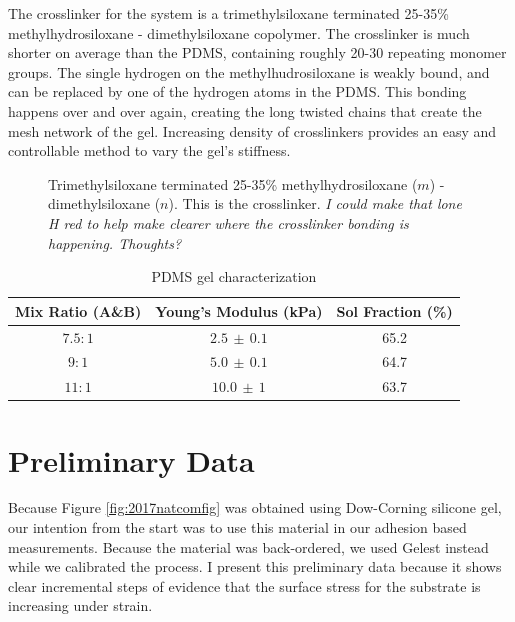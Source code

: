 The crosslinker for the system is a trimethylsiloxane terminated 25-35\% methylhydrosiloxane - dimethylsiloxane copolymer. The crosslinker is much shorter on average than the PDMS, containing roughly 20-30 repeating monomer groups. The single hydrogen on the methylhudrosiloxane is weakly bound, and can be replaced by one of the hydrogen atoms in the PDMS. This bonding happens over and over again, creating the long twisted chains that create the mesh network of the gel. Increasing density of crosslinkers provides an easy and controllable method to vary the gel's stiffness.

\begin{figure}
	\centering
	\label{fig:HMS-301}
	\caption[HMS-301]{Trimethylsiloxane terminated 25-35\% methylhydrosiloxane ($m$) - dimethylsiloxane ($n$). This is the crosslinker. \emph{I could make that lone H red to help make clearer where the crosslinker bonding is happening. Thoughts?}}
\end{figure}

\begin{table}[h!]
	\caption[PDMS ratios Characterization]{PDMS gel characterization}
	\begin{center}
		\begin{tabular}{|c||c||c|}
			\hline
			Mix Ratio (A\&B) & Young's Modulus (kPa) & Sol Fraction (\%)\\
			\hline
			$7.5:1$ & $2.5 \,\pm\, 0.1$ & 65.2\\
			\hline
			$9:1$ & $5.0 \, \pm\, 0.1$  & 64.7\\
			\hline
			$11:1$ & $10.0 \,\pm\, 1$  & 63.7\\
			\hline
		\end{tabular}
	\end{center}
	\label{tab:recipes}
\end{table}


\section{Preliminary Data}
Because Figure \ref{fig:2017natcomfig} was obtained using Dow-Corning silicone gel, our intention from the start was to use this material in our adhesion based measurements. Because the material was back-ordered, we used Gelest instead while we calibrated the process. I present this preliminary data because it shows clear incremental steps of evidence that the surface stress for the substrate is increasing under strain.  
